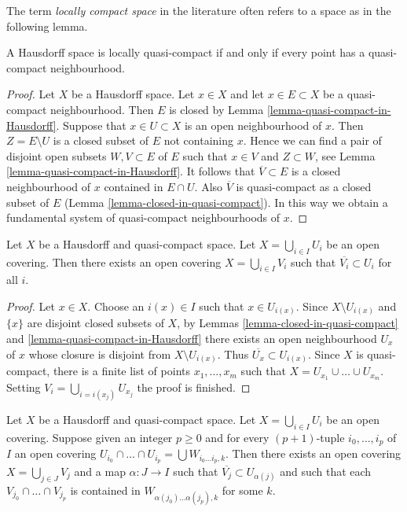 \noindent
The term {\it locally compact space} in the literature often refers
to a space as in the following lemma.

\begin{lemma}
\label{lemma-locally-quasi-compact-Hausdorff}
A Hausdorff space is locally quasi-compact if and only if every point
has a quasi-compact neighbourhood.
\end{lemma}

\begin{proof}
Let $X$ be a Hausdorff space. Let $x \in X$ and let $x \in E \subset X$
be a quasi-compact neighbourhood. Then $E$ is closed by
Lemma \ref{lemma-quasi-compact-in-Hausdorff}.
Suppose that $x \in U \subset X$ is an open neighbourhood of $x$.
Then $Z = E \setminus U$ is a closed subset of $E$ not containing $x$.
Hence we can find a pair of disjoint open subsets $W, V \subset E$
of $E$ such that $x \in V$ and $Z \subset W$, see
Lemma \ref{lemma-quasi-compact-in-Hausdorff}.
It follows that $\overline{V} \subset E$ is a closed neighbourhood
of $x$ contained in $E \cap U$. Also $\overline{V}$ is quasi-compact
as a closed subset of $E$ (Lemma \ref{lemma-closed-in-quasi-compact}).
In this way we obtain a fundamental system of quasi-compact neighbourhoods
of $x$.
\end{proof}

\begin{lemma}
\label{lemma-relatively-compact-refinement}
Let $X$ be a Hausdorff and quasi-compact space.
Let $X = \bigcup_{i \in I} U_i$ be an open covering.
Then there exists an open covering $X = \bigcup_{i \in I} V_i$
such that $\overline{V_i} \subset U_i$ for all $i$.
\end{lemma}

\begin{proof}
Let $x \in X$. Choose an $i(x) \in I$ such that $x \in U_{i(x)}$.
Since $X \setminus U_{i(x)}$ and $\{x\}$ are disjoint closed
subsets of $X$, by Lemmas \ref{lemma-closed-in-quasi-compact} and
\ref{lemma-quasi-compact-in-Hausdorff}
there exists an open neighbourhood $U_x$ of $x$
whose closure is disjoint from $X \setminus U_{i(x)}$.
Thus $\overline{U_x} \subset U_{i(x)}$. Since $X$ is quasi-compact,
there is a finite list of points $x_1, \ldots, x_m$ such that
$X = U_{x_1} \cup \ldots \cup U_{x_m}$. Setting
$V_i = \bigcup_{i = i(x_j)} U_{x_j}$ the proof is finished.
\end{proof}

\begin{lemma}
\label{lemma-refine-covering}
Let $X$ be a Hausdorff and quasi-compact space.
Let $X = \bigcup_{i \in I} U_i$ be an open covering.
Suppose given an integer $p \geq 0$ and for every $(p + 1)$-tuple
$i_0, \ldots, i_p$ of $I$ an open covering
$U_{i_0} \cap \ldots \cap U_{i_p} = \bigcup W_{i_0 \ldots i_p, k}$.
Then there exists an open covering $X = \bigcup_{j \in J} V_j$
and a map $\alpha : J \to I$ such that $\overline{V_j} \subset U_{\alpha(j)}$
and such that each $V_{j_0} \cap \ldots \cap V_{j_p}$
is contained in $W_{\alpha(j_0) \ldots \alpha(j_p), k}$
for some $k$.
\end{lemma}

